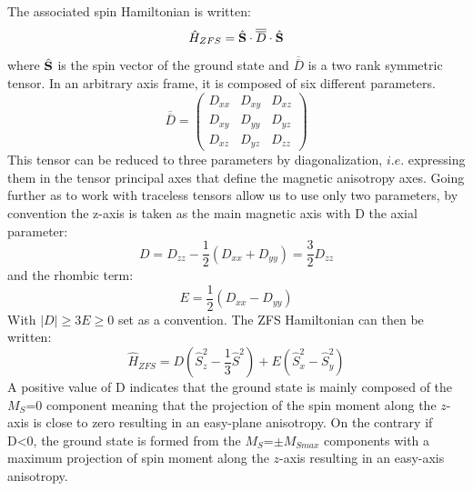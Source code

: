 \documentclass[12pt]{report}
\numberwithin{equation}{section}
\begin{document}
The associated spin Hamiltonian is written\cite{noauthor_molecular_1995}:
\begin{equation}\label{SDS}
    \hat{H}_{ZFS}=\hat{\vb S} \cdot \overline{\overline{D}} \cdot \hat{\vb S}
\end{equation}
where $\hat{\vb S}$ is the spin vector of the ground state and $\overline{\overline{D}}$ is a two rank symmetric tensor. In an arbitrary axis frame, it is composed of six different parameters.
\begin{equation}
    \overline{\overline{D}}=\begin{pmatrix}
        D_{xx} & D_{xy} & D_{xz}\\
        D_{xy} & D_{yy} & D_{yz}\\
        D_{xz} & D_{yz} & D_{zz}
    \end{pmatrix}
\end{equation}
This tensor can be reduced to three parameters by diagonalization, $\textit{i.e.}$ expressing them in the tensor principal axes that define the magnetic anisotropy axes.
Going further as to work with traceless tensors allow us to use only two parameters, by convention the z-axis is taken as the main magnetic axis with D the axial parameter:
\begin{equation}\label{ParametreD}
    D=D_{zz}-\frac{1}{2}(D_{xx}+D_{yy})=\frac{3}{2}D_{zz}
\end{equation}
and the rhombic term:
\begin{equation}\label{ParametreE}
    E=\frac{1}{2}(D_{xx}-D_{yy})
\end{equation}
With $|D| \geq 3E \geq 0$ set as a convention\cite{maurice_universal_2009}. 
The ZFS Hamiltonian can then be written:
\begin{equation}\label{HZFS}
    \hat{H}_{ZFS}=D (\hat{S}_z^2-\frac{1}{3}\hat{S}^2)+E(\hat{S}_x^2-\hat{S}_y^2)
\end{equation}
A positive value of D indicates that the ground state is mainly composed of the $M_S$=0 component meaning that the projection of the spin moment along the $z$-axis is close to zero resulting in an easy-plane anisotropy. 
On the contrary if D<0, the ground state is formed from the $M_S$=$\pm M_{Smax}$ components with a maximum projection of spin moment along the $z$-axis resulting in an easy-axis anisotropy.
\end{document}
